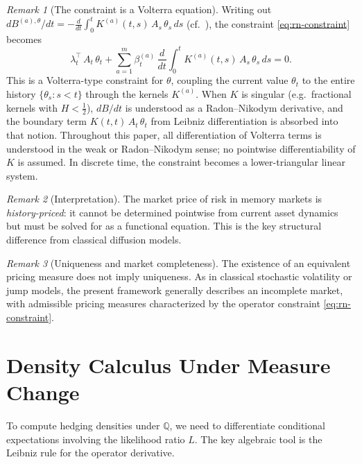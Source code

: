 \documentclass[11pt]{article}
\theoremstyle{plain}
\theoremstyle{definition}
\theoremstyle{remark}
\newtheorem{remark}{Remark}[section]
\newcommand{\QQ}{\mathbb{Q}}
\begin{document}
\begin{remark}[The constraint is a Volterra equation]
Writing out $dB^{(a),\theta}/dt = -\frac{d}{dt}\int_0^t K^{(a)}(t,s)\,A_s\,\theta_s\,ds$
(cf.\ ), the constraint \eqref{eq:rn-constraint} becomes
\[
\lambda_t^\top\,A_t\,\theta_t + \sum_{a=1}^m \beta_t^{(a)}\,\frac{d}{dt}\int_0^t K^{(a)}(t,s)\,A_s\,\theta_s\,ds = 0.
\]
This is a Volterra-type constraint for $\theta$, coupling the current value
$\theta_t$ to the entire history $\{\theta_s : s < t\}$ through the kernels
$K^{(a)}$. When $K$ is singular (e.g.\ fractional kernels with $H < \frac{1}{2}$),
$dB/dt$ is understood as a Radon--Nikodym derivative, and the boundary term
$K(t,t)\,A_t\,\theta_t$ from Leibniz differentiation is absorbed into that notion.
Throughout this paper, all differentiation of Volterra terms is understood in the
weak or Radon--Nikodym sense; no pointwise differentiability of $K$ is assumed.
In discrete time, the constraint becomes a lower-triangular linear system.
\end{remark}

\begin{remark}[Interpretation]
The market price of risk in memory markets is \emph{history-priced}: it
cannot be determined pointwise from current asset dynamics but must be
solved for as a functional equation. This is the key structural difference
from classical diffusion models.
\end{remark}

\begin{remark}[Uniqueness and market completeness]
The existence of an equivalent pricing measure does not imply uniqueness.
As in classical stochastic volatility or jump models, the present framework
generally describes an incomplete market, with admissible pricing measures
characterized by the operator constraint \eqref{eq:rn-constraint}.
\end{remark}

\section{Density Calculus Under Measure Change}\label{sec:density}

To compute hedging densities under $\QQ$, we need to differentiate conditional
expectations involving the likelihood ratio $L$. The key algebraic tool is
the Leibniz rule for the operator derivative.
\end{document}
